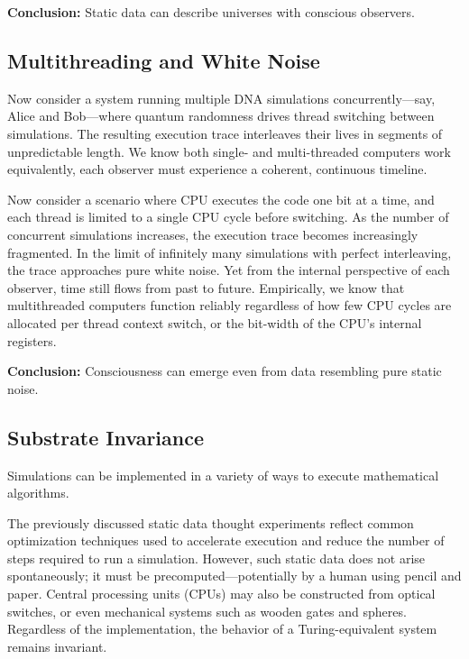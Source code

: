 \documentclass[11pt]{article}
\begin{document}
\textbf{Conclusion:} Static data can describe universes with conscious observers.



\subsection{Multithreading and White Noise}

Now consider a system running multiple DNA simulations concurrently—say, Alice and Bob—where quantum randomness drives thread 
switching between simulations. The resulting execution trace interleaves their lives in segments of unpredictable length. 
We know both single- and multi-threaded computers work equivalently, each observer must experience a coherent, continuous timeline.

Now consider a scenario where CPU executes the code one bit at a  time, and each thread is limited to a single CPU cycle before 
switching. As the number of concurrent simulations increases, the execution trace becomes increasingly fragmented. In the limit 
of infinitely many simulations with perfect interleaving, the trace approaches pure white noise. Yet from the internal 
perspective of each observer, time still flows from past to future. Empirically, we know that multithreaded computers 
function reliably regardless of how few CPU cycles are allocated per thread context switch,
or the bit-width of the CPU's internal registers.

\textbf{Conclusion:} Consciousness can emerge even from data resembling pure static noise.



\subsection{Substrate Invariance}

Simulations can be implemented in a variety of ways to execute mathematical algorithms.

The previously discussed static data thought experiments reflect common optimization techniques used to accelerate 
execution and reduce the number of steps required to run a simulation. However, such static data does not arise 
spontaneously; it must be precomputed—potentially by a human using pencil and paper. Central processing units (CPUs) 
may also be constructed from optical switches, or even mechanical systems such as wooden gates and spheres. 
Regardless of the implementation, the behavior of a Turing-equivalent system remains invariant.
\end{document}
